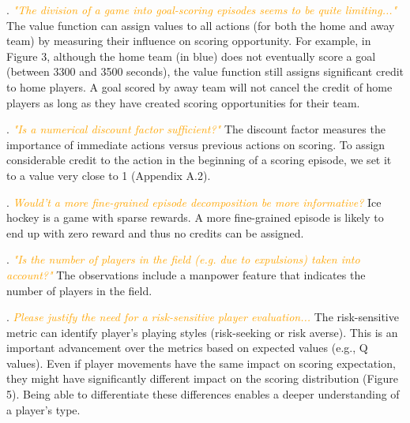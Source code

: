 \documentclass{article}
\begin{document}
. \textcolor{orange}{\it "The division of a game into goal-scoring episodes seems to be quite limiting..." }
The value function can assign values to all actions (for both the home and away team) by measuring their influence on scoring opportunity. For example, in Figure 3, although the home team (in blue) does not eventually score a goal (between 3300 and 3500 seconds), the value function still assigns significant credit to home players.  A goal scored by away team will not cancel the credit of home players as long as they have created scoring opportunities for their team.

. \textcolor{orange}{\it "Is a numerical discount factor sufficient?"}
The discount factor measures the importance of immediate actions versus previous actions on scoring. To assign considerable credit to the action in the beginning of a scoring episode, we set it to a value very close to 1 (Appendix A.2).

. \textcolor{orange}{\it Would’t a more fine-grained episode decomposition be more informative?}
Ice hockey is a game with sparse rewards. A more fine-grained episode is likely to end up with zero reward and thus no credits can be assigned.

. \textcolor{
orange}{\it "Is the number of players in the field (e.g. due to expulsions) taken into account?"}
The observations include a manpower feature that indicates the number of players in the field.

. \textcolor{orange}{\it Please justify the need for a risk-sensitive player evaluation...}
The risk-sensitive metric can 
identify player's playing styles (risk-seeking or risk averse). This is an important advancement over the metrics based on expected values (e.g., Q values). Even if player movements have the same impact on scoring expectation, they might have significantly different impact on the scoring distribution (Figure 5). Being able to differentiate these differences enables a deeper understanding of a player's type.  
\end{document}
